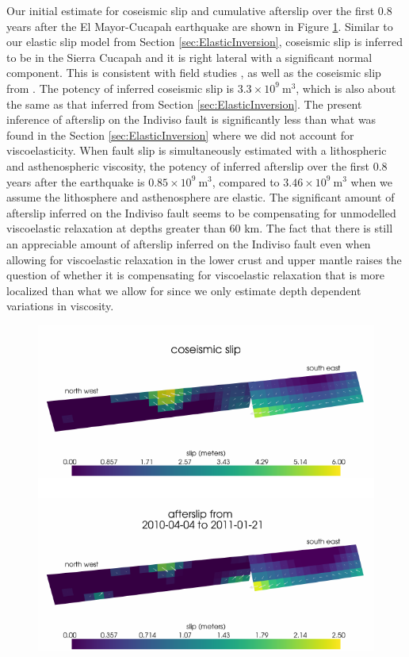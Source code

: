 \documentclass[1p]{elsarticle}
\begin{document}
Our initial estimate for coseismic slip and cumulative afterslip over the first 0.8 years after the El Mayor-Cucapah earthquake are shown in Figure \ref{fig:InitialSlip}.  Similar to our elastic slip model from Section \ref{sec:ElasticInversion}, coseismic slip is inferred to be in the Sierra Cucapah and it is right lateral with a significant normal component.  This is consistent with field studies \citep{Fletcher2014}, as well as the coseismic slip from \citet{Wei2011}. The potency of inferred coseismic slip is $3.3\times 10^{9}\ \mathrm{m}^3$, which is also about the same as that inferred from Section \ref{sec:ElasticInversion}. The present inference of afterslip on the Indiviso fault is significantly less than what was found in the Section \ref{sec:ElasticInversion} where we did not account for viscoelasticity. When fault slip is simultaneously estimated with a lithospheric and asthenospheric viscosity, the potency of inferred afterslip over the first 0.8 years after the earthquake is $0.85\times 10^9\ \mathrm{m}^3$, compared to $3.46\times10^{9}\ \mathrm{m}^3$ when we assume the lithosphere and asthenosphere are elastic.  The significant amount of afterslip inferred on the Indiviso fault seems to be compensating for unmodelled viscoelastic relaxation at depths greater than $60$ km.  The fact that there is still an appreciable amount of afterslip inferred on the Indiviso fault even when allowing for viscoelastic relaxation in the lower crust and upper mantle raises the question of whether it is compensating for viscoelastic relaxation that is more localized than what we allow for since we only estimate depth dependent variations in viscosity.  

\begin{figure}
\includegraphics[scale=0.7]{Figures/InitialSlip}
\caption{}
\label{fig:InitialSlip}
\end{figure} 
\end{document}
